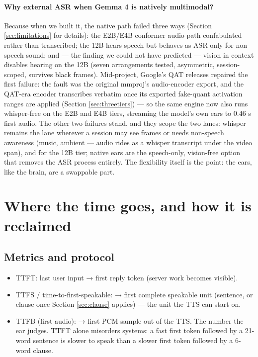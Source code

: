 \documentclass{article}
\begin{document}
\paragraph{Why external ASR when Gemma 4 is natively multimodal?} Because when we built it, the native path failed three ways (Section \ref{sec:limitations} for details): the E2B/E4B conformer audio path confabulated rather than transcribed; the 12B hears speech but behaves as ASR-only for non-speech sound; and — the finding we could not have predicted — vision in context disables hearing on the 12B (seven arrangements tested, asymmetric, session-scoped, survives black frames). Mid-project, Google's QAT releases repaired the first failure: the fault was the original mmproj's audio-encoder export, and the QAT-era encoder transcribes verbatim once its exported fake-quant activation ranges are applied (Section \ref{sec:threetiers}) — so the same engine now also runs whisper-free on the E2B and E4B tiers, streaming the model's own ears to 0.46 s first audio. The other two failures stand, and they scope the two lanes: whisper remains the lane wherever a session may see frames or needs non-speech awareness (music, ambient — audio rides as a whisper transcript under the video span), and for the 12B tier; native ears are the speech-only, vision-free option that removes the ASR process entirely. The flexibility itself is the point: the ears, like the brain, are a swappable part.

\section{Where the time goes, and how it is reclaimed}

\subsection{Metrics and protocol}
\label{sec:metrics}

\begin{itemize}
	\item TTFT: last user input → first reply token (server work becomes visible).
	\item TTFS / time-to-first-speakable: → first complete speakable unit (sentence, or clause once Section \ref{sec:clause} applies) — the unit the TTS can start on.
	\item TTFB (first audio): → first PCM sample out of the TTS. The number the ear judges. TTFT alone misorders systems: a fast first token followed by a 21-word sentence is slower to speak than a slower first token followed by a 6-word clause.
\end{itemize}
\end{document}
